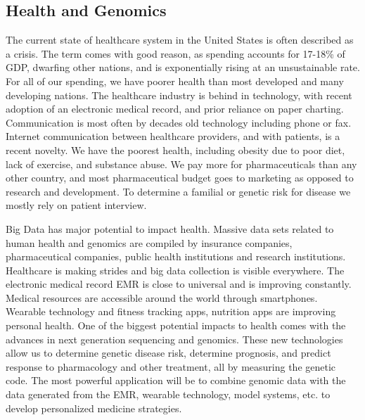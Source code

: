 \documentclass[sigconf]{acmart}
\begin{document}
\subsection{Health and Genomics}
    The current state of healthcare system in the United States is often
described as a crisis.  The term comes with good reason, as spending
accounts for 17-18\% of GDP, dwarfing other nations, and is
exponentially rising at an unsustainable rate.  For all of our
spending, we have poorer health than most developed and many
developing nations.  The healthcare industry is behind in technology,
with recent adoption of an electronic medical record, and prior
reliance on paper charting.  Communication is most often by decades
old technology including phone or fax.  Internet communication between
healthcare providers, and with patients, is a recent novelty.  We have
the poorest health, including obesity due to poor diet, lack of
exercise, and substance abuse.  We pay more for pharmaceuticals than
any other country, and most pharmaceutical budget goes to marketing as
opposed to research and development.  To determine a familial or genetic risk for disease we mostly rely on patient interview.

Big Data has major potential to impact health.  Massive data sets
related to human health and genomics are compiled by insurance companies,
pharmaceutical companies, public health institutions and research
institutions.  \cite{fox6} Healthcare is
making strides and big data collection is visible everywhere.  The
electronic medical record EMR is close to universal and is improving
constantly.  Medical resources are accessible around the world through
smartphones.  Wearable technology and fitness
tracking apps, nutrition apps are improving personal health.  One of the biggest potential impacts to health comes with the advances in next generation sequencing and genomics. These new technologies allow us to determine genetic disease risk, determine prognosis, and predict response to pharmacology and other treatment, all by measuring the genetic code.  The most powerful application will be to combine  genomic data with the data generated from the EMR, wearable technology, model systems, etc. to develop personalized medicine strategies.     
\end{document}
